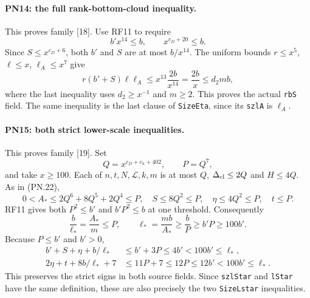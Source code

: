 \paragraph{PN14: the full rank-bottom-cloud inequality.}
This proves family [18]. Use RF11 to require
\[
              b'x^{14}\leq b,
              \qquad x^{c_D+20}\leq b.
\]
Since $S\leq x^{c_D+6}$, both $b'$ and $S$ are at most $b/x^{14}$.
The uniform bounds $r\leq x^5$, $\ell\leq x$, $\ell_A\leq x^7$
give
\[
 r(b'+S)\ell\ell_A
       \leq x^{13}\frac{2b}{x^{14}}
       =\frac{2b}{x}\leq d_2mb,                           \tag{PN.35}
\]
where the last inequality uses $d_2\geq x^{-1}$ and $m\geq2$.
This proves the actual \texttt{rbS} field. The same inequality is the
last clause of \texttt{SizeEta}, since its \texttt{szlA} is $\ell_A$.

\paragraph{PN15: both strict lower-scale inequalities.}
This proves family [19]. Set
\[
 Q=x^{c_D+c_h+402},\qquad P=Q^7,
\]
and take $x\geq100$. Each of $n,t,N,\mathcal L,k,m$ is at most $Q$,
$\Delta_{\rm cl}\leq2Q$ and $H\leq4Q$. As in (PN.22),
\[
 0<A_*\leq2Q^6+8Q^5+2Q^4\leq P,\quad
 S\leq8Q^2\leq P,\quad\eta\leq4Q^2\leq P,\quad t\leq P.
\]
RF11 gives both $P^2\leq b'$ and $b'P^2\leq b$ at one threshold.
Consequently
\[
 \frac b{\ell_*}=\frac{A_*}{m}\leq P,
 \qquad \ell_*=\frac{mb}{A_*}\geq\frac bP
                  \geq b'P\geq100b'.                      \tag{PN.36}
\]
Because $P\leq b'$ and $b'>0$,
\begin{align*}
 b'+S+\eta+b/\ell_*&\leq b'+3P\leq4b'<100b'\leq\ell_*,\\
 2\eta+t+8b/\ell_*+7&\leq11P+7\leq12P
                                      \leq12b'<100b'\leq\ell_*.
                                                               \tag{PN.37}
\end{align*}
This preserves the strict signs in both source fields.
Since \texttt{szlStar} and \texttt{lStar} have the same definition,
these are also precisely the two \texttt{SizeLstar} inequalities.

